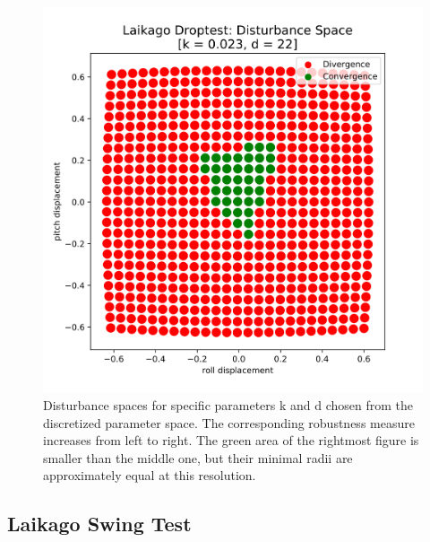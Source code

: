 \begin{figure}[h]
\begin{minipage}{0.33\textwidth}
        \end{minipage}
        \begin{minipage}{0.33\textwidth}
            \centering
            \includegraphics[width=\textwidth]{figures/droptest_ds_opt_v4.png} %
        \end{minipage}

    \caption[Disturbance Spaces for Selected Parameter Sets, Drop Test]{Disturbance spaces for specific parameters k and d chosen from the discretized parameter space. The corresponding robustness measure increases from left to right. The green area of the rightmost figure is smaller than the middle one, but their minimal radii are approximately equal at this resolution.}
    \label{fig:dropds}
    \end{figure}
    \newpage



    \subsection{Laikago Swing Test}

